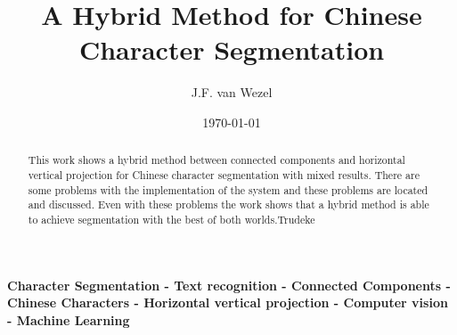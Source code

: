 \documentclass[a4paper]{article}
\title{A Hybrid Method for Chinese Character Segmentation}
\author{J.F. van Wezel}
\affil{University of Groningen}
\date{\today}
\begin{document}
\maketitle


\begin{abstract}
   This work shows a hybrid method between connected components and horizontal vertical projection for Chinese character segmentation with mixed results. There are some problems with the implementation of the system and these problems are located and discussed. Even with these problems the work shows that a hybrid method is able to achieve segmentation with the best of both worlds.Trudeke
\end{abstract}

\smallskip
\noindent \textbf{Character Segmentation - Text recognition - Connected Components - Chinese Characters - Horizontal vertical projection - Computer vision - Machine Learning}













\end{document}
